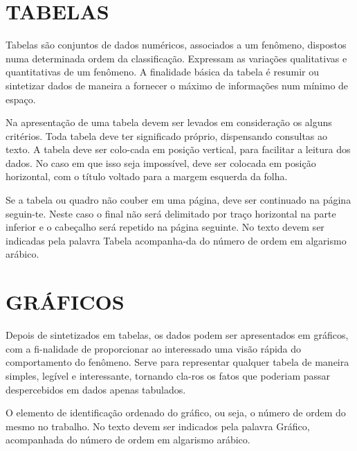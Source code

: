 

\section{TABELAS}

Tabelas são conjuntos de dados numéricos, associados a um
fenômeno, dispostos numa determinada ordem da classificação. Expressam as variações qualitativas e quantitativas de um fenômeno. A finalidade básica da tabela é resumir ou sintetizar dados de maneira a fornecer o máximo de informações num mínimo de espaço.

Na apresentação de uma tabela devem ser levados em consideração
os alguns critérios. Toda tabela deve ter significado próprio, dispensando consultas ao texto. A tabela deve ser colo-cada em posição vertical, para facilitar a leitura dos dados. No caso em que isso seja impossível, deve ser colocada em posição horizontal, com o título voltado para a margem esquerda da folha.

Se a tabela ou quadro não couber em uma página, deve ser
continuado na página seguin-te. Neste caso o final não será delimitado por traço horizontal na parte inferior e o cabeçalho será repetido na página seguinte. No texto devem ser indicadas pela palavra Tabela acompanha-da do número de ordem em algarismo arábico.



\section{GRÁFICOS}

Depois de sintetizados em tabelas, os dados podem ser
apresentados em gráficos, com a fi-nalidade de proporcionar ao interessado uma visão rápida do comportamento do fenômeno. Serve para representar qualquer tabela de maneira simples, legível e interessante, tornando cla-ros os fatos que poderiam passar despercebidos em dados apenas tabulados.

O elemento de identificação ordenado do gráfico, ou seja, o
número de ordem do mesmo no trabalho. No texto devem ser indicados pela palavra Gráfico, acompanhada do número de ordem em algarismo arábico.



